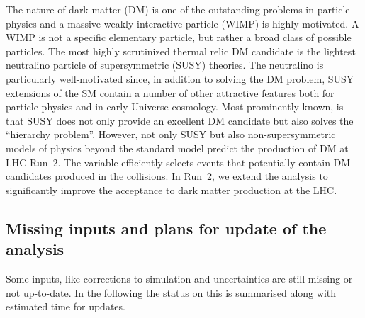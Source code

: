 The nature of dark matter (DM) is one of the outstanding problems in
particle physics and a massive weakly interactive particle (WIMP) is
highly motivated. A WIMP is not a specific elementary particle, but
rather a broad class of possible particles. The most highly
scrutinized thermal relic DM candidate is the lightest neutralino
particle of supersymmetric (SUSY) theories. The neutralino is
particularly well-motivated since, in addition to solving the DM
problem, SUSY extensions of the SM contain a number of other
attractive features both for particle physics and in early Universe
cosmology. Most prominently known, is that SUSY does not only provide
an excellent DM candidate but also solves the ``hierarchy problem''.
However, not only SUSY but also non-supersymmetric models of physics
beyond the standard model predict the production of DM at LHC Run~2.
The \alphat variable efficiently selects events that potentially
contain DM candidates produced in the collisions. In Run~2, we extend
the \alphat analysis to significantly improve the acceptance to dark
matter production at the LHC. 



\subsection{Missing inputs and plans for update of the analysis}
\label{sec:inputs-and-updates}
Some inputs, like corrections to simulation and uncertainties are still missing or not up-to-date. 
In the following the status on this is summarised along with estimated time for updates.

